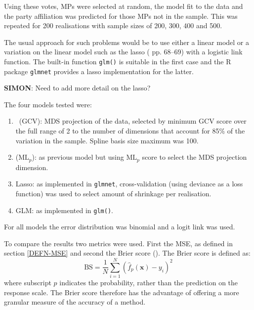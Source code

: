 Using these votes, MPs were selected at random, the model fit to the data and the party affiliation was predicted for those MPs not in the sample. This was repeated for 200 realisations with sample sizes of 200, 300, 400 and 500.

The usual approach for such problems would be to use either a linear model or a variation on the linear model such as the lasso (\cite{elements} pp. 68--69) with a logistic link function. The built-in function \texttt{glm()} is suitable in the first case and the \textsf{R} package \texttt{glmnet} provides a lasso implementation for the latter.

\textbf{SIMON}: Need to add more detail on the lasso?

The four models tested were:
\begin{enumerate}
	\item \mdsds\ (GCV): MDS projection of the data, selected by minimum GCV score over the full range of 2 to the number of dimensions that account for 85\% of the variation in the sample. Spline basis size maximum was 100.
	\item \mdsds\: ($\text{ML}_p$): as previous model but using $\text{ML}_p$ score to select the MDS projection dimension.
	\item Lasso: as implemented in \texttt{glmnet}, cross-validation (using deviance as a loss function) was used to select amount of shrinkage per realisation.
	\item GLM: as implemented in \texttt{glm()}.
\end{enumerate}
For all models the error distribution was binomial and a logit link was used.

To compare the results two metrics were used. First the MSE, as defined in section \ref{DEFN-MSE} and second the Brier score (\cite{brier50}). The Brier score is defined as:
\begin{equation}
\text{BS} = \frac{1}{N} \sum_{i=1}^N (\hat{f}_p(\mathbf{x})-y_i)^2
\end{equation}
where subscript $p$ indicates the probability, rather than the prediction on the response scale. The Brier score therefore has the advantage of offering a more granular measure of the accuracy of a method.

